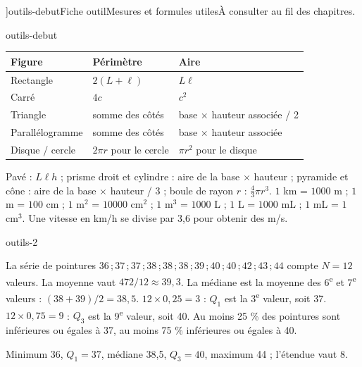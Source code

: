 \editionPage[\pdfbookmark[0]{Fiches outils}{bm-outils-debut-parent}]{outils-debut}{Fiche outil}{Mesures et formules utiles}{À consulter au fil des chapitres.}
\begin{blocEdition}{outils-debut}

\begin{tabularx}{\linewidth}{@{}lYY@{}}\toprule
Figure & Périmètre & Aire\\\midrule
Rectangle & $2(L+\ell)$ & $L\ell$\\[2mm]
Carré & $4c$ & $c^2$\\[2mm]
Triangle & somme des côtés & base $\times$ hauteur associée / 2\\[2mm]
Parallélogramme & somme des côtés & base $\times$ hauteur associée\\[2mm]
Disque / cercle & $2\pi r$ pour le cercle & $\pi r^2$ pour le disque\\\bottomrule
\end{tabularx}
Pavé : $L\ell h$ ; prisme droit et cylindre : aire de la base $\times$ hauteur ;
pyramide et cône : aire de la base $\times$ hauteur / 3 ; boule de rayon $r$ : $\frac43\pi r^3$.
$1$ km = $1000$ m ; $1$ m = $100$ cm ; $1$ m$^2$ = $10000$ cm$^2$ ;
$1$ m$^3$ = $1000$ L ; $1$ L = $1000$ mL ; $1$ mL = $1$ cm$^3$.
Une vitesse en km/h se divise par 3,6 pour obtenir des m/s.

\end{blocEdition}
\begin{blocEdition}{outils-2}

La série de pointures $36\,;37\,;37\,;38\,;38\,;38\,;39\,;40\,;40\,;42\,;43\,;44$ compte
$N=12$ valeurs. La moyenne vaut $472/12\approx39{,}3$. La médiane est la moyenne des
6\textsuperscript{e} et 7\textsuperscript{e} valeurs : $(38+39)/2=38{,}5$.
$12\times0{,}25=3$ : $Q_1$ est la 3\textsuperscript{e} valeur, soit 37.
$12\times0{,}75=9$ : $Q_3$ est la 9\textsuperscript{e} valeur, soit 40.
Au moins 25 \% des pointures sont inférieures ou égales à 37, au moins 75 \%
inférieures ou égales à 40.
\begin{center}\end{center}
Minimum 36, $Q_1=37$, médiane 38,5, $Q_3=40$, maximum 44 ; l’étendue vaut 8.

\end{blocEdition}
